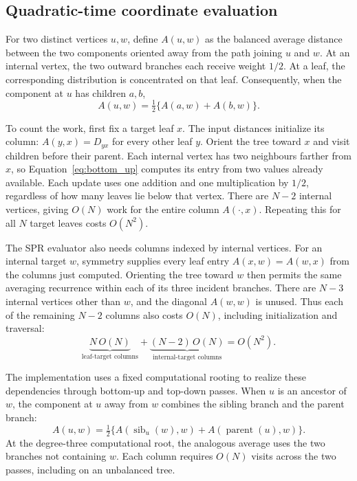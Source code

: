 \documentclass[11pt,a4paper]{article}
\makeatletter
\DeclareRobustCommand{\_}{\ifmmode\nfss@text{\textunderscore}\else\textunderscore\allowbreak\fi}
\theoremstyle{definition}
\makeatother
\begin{document}
\subsection{Quadratic-time coordinate evaluation}

For two distinct vertices $u,w$, define $A(u,w)$ as the balanced average distance between the two components oriented away from the path joining $u$ and $w$.
At an internal vertex, the two outward branches each receive weight $1/2$.
At a leaf, the corresponding distribution is concentrated on that leaf.
Consequently, when the component at $u$ has children $a,b$,
\begin{equation}
 A(u,w)=\tfrac12\{A(a,w)+A(b,w)\}.
 \label{eq:bottom_up}
\end{equation}

To count the work, first fix a target leaf $x$.
The input distances initialize its column: $A(y,x)=D_{yx}$ for every other leaf $y$.
Orient the tree toward $x$ and visit children before their parent.
Each internal vertex has two neighbours farther from $x$, so Equation~\eqref{eq:bottom_up} computes its entry from two values already available.
Each update uses one addition and one multiplication by $1/2$, regardless of how many leaves lie below that vertex.
There are $N-2$ internal vertices, giving $O(N)$ work for the entire column $A(\cdot,x)$.
Repeating this for all $N$ target leaves costs $O(N^2)$.

The SPR evaluator also needs columns indexed by internal vertices.
For an internal target $w$, symmetry supplies every leaf entry $A(x,w)=A(w,x)$ from the columns just computed.
Orienting the tree toward $w$ then permits the same averaging recurrence within each of its three incident branches.
There are $N-3$ internal vertices other than $w$, and the diagonal $A(w,w)$ is unused.
Thus each of the remaining $N-2$ columns also costs $O(N)$, including initialization and traversal:
\[
 \underbrace{N\,O(N)}_{\text{leaf-target columns}}
 +\underbrace{(N-2)\,O(N)}_{\text{internal-target columns}}
 =O(N^2).
\]

The implementation uses a fixed computational rooting to realize these dependencies through bottom-up and top-down passes.
When $u$ is an ancestor of $w$, the component at $u$ away from $w$ combines the sibling branch and the parent branch:
\begin{equation}
 A(u,w)=\tfrac12\{A(\operatorname{sib}_u(w),w)
                         +A(\operatorname{parent}(u),w)\}.
 \label{eq:top_down}
\end{equation}
At the degree-three computational root, the analogous average uses the two branches not containing $w$.
Each column requires $O(N)$ visits across the two passes, including on an unbalanced tree.
\end{document}
